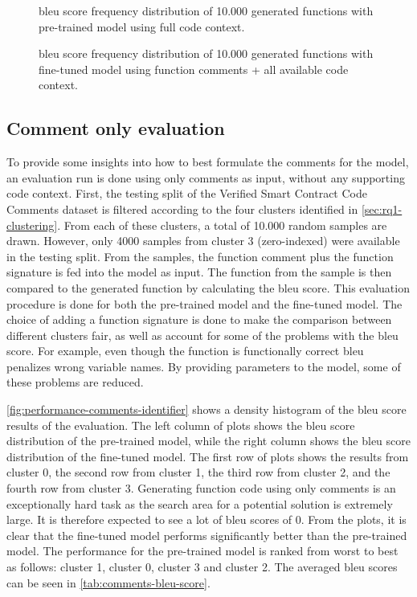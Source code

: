 \begin{figure}[htp]
    \centering
    
    \caption{\acrshort{bleu} score frequency distribution of 10.000 generated functions with pre-trained model using full code context.}
    \label{fig:performance-code-context_pretrained}
    \vspace*{\floatsep}%
    
    \caption{\acrshort{bleu} score frequency distribution of 10.000 generated functions with fine-tuned model using function comments + all available code context.}
    \label{fig:performance-code-context_finetuned}
\end{figure}

\subsection{Comment only evaluation}
\label{sec:rq1-comment-only}
To provide some insights into how to best formulate the comments for the model, an evaluation run is done using only comments as input, without any supporting code context. First, the testing split of the Verified Smart Contract Code Comments dataset is filtered according to the four clusters identified in \cref{sec:rq1-clustering}. From each of these clusters, a total of 10.000 random samples are drawn. However, only 4000 samples from cluster 3 (zero-indexed) were available in the testing split. From the samples, the function comment plus the function signature is fed into the model as input. The function from the sample is then compared to the generated function by calculating the \gls{bleu} score. This evaluation procedure is done for both the pre-trained model and the fine-tuned model. The choice of adding a function signature is done to make the comparison between different clusters fair, as well as account for some of the problems with the \acrshort{bleu} score. For example, even though the function is functionally correct \acrshort{bleu} penalizes wrong variable names. By providing parameters to the model, some of these problems are reduced.

\cref{fig:performance-comments-identifier} shows a density histogram of the \acrshort{bleu} score results of the evaluation. The left column of plots shows the \acrshort{bleu} score distribution of the pre-trained model, while the right column shows the \acrshort{bleu} score distribution of the fine-tuned model. The first row of plots shows the results from cluster 0, the second row from cluster 1, the third row from cluster 2, and the fourth row from cluster 3. Generating function code using only comments is an exceptionally hard task as the search area for a potential solution is extremely large. It is therefore expected to see a lot of \acrshort{bleu} scores of 0. From the plots, it is clear that the fine-tuned model performs significantly better than the pre-trained model. The performance for the pre-trained model is ranked from worst to best as follows: cluster 1, cluster 0, cluster 3 and cluster 2. The averaged \acrshort{bleu} scores can be seen in \cref{tab:comments-bleu-score}.

